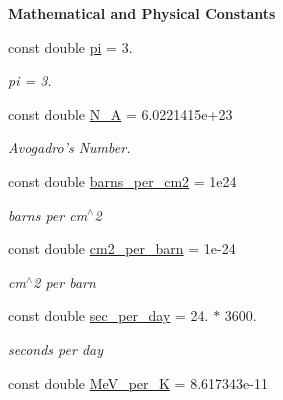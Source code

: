 \begin{Indent}{\bf Mathematical and Physical Constants}\par
\begin{DoxyCompactItemize}
\item 
\hypertarget{namespacepyne_a3b91aba14e56f740dc75b78b9eba037a}{const double \hyperlink{namespacepyne_a3b91aba14e56f740dc75b78b9eba037a}{pi} = 3.}\label{namespacepyne_a3b91aba14e56f740dc75b78b9eba037a}

\begin{DoxyCompactList}\small\item\em pi = 3. \end{DoxyCompactList}\item 
\hypertarget{namespacepyne_a44461c2367af5fc9b6bb0988aac2429b}{const double \hyperlink{namespacepyne_a44461c2367af5fc9b6bb0988aac2429b}{N\+\_\+\+A} = 6.\+0221415e+23}\label{namespacepyne_a44461c2367af5fc9b6bb0988aac2429b}

\begin{DoxyCompactList}\small\item\em Avogadro's Number. \end{DoxyCompactList}\item 
\hypertarget{namespacepyne_ad475cf6f124859f735f6d93ec206ec0d}{const double \hyperlink{namespacepyne_ad475cf6f124859f735f6d93ec206ec0d}{barns\+\_\+per\+\_\+cm2} = 1e24}\label{namespacepyne_ad475cf6f124859f735f6d93ec206ec0d}

\begin{DoxyCompactList}\small\item\em barns per cm$^\wedge$2 \end{DoxyCompactList}\item 
\hypertarget{namespacepyne_a0706fc6ba35f0c6f85cea550344c1815}{const double \hyperlink{namespacepyne_a0706fc6ba35f0c6f85cea550344c1815}{cm2\+\_\+per\+\_\+barn} = 1e-\/24}\label{namespacepyne_a0706fc6ba35f0c6f85cea550344c1815}

\begin{DoxyCompactList}\small\item\em cm$^\wedge$2 per barn \end{DoxyCompactList}\item 
\hypertarget{namespacepyne_a3a54f183e7323b4d62c12f309c3af081}{const double \hyperlink{namespacepyne_a3a54f183e7323b4d62c12f309c3af081}{sec\+\_\+per\+\_\+day} = 24. $\ast$ 3600.}\label{namespacepyne_a3a54f183e7323b4d62c12f309c3af081}

\begin{DoxyCompactList}\small\item\em seconds per day \end{DoxyCompactList}\item 
const double \hyperlink{namespacepyne_af4fb3aac22e7bda0ece3bcf515151611}{Me\+V\+\_\+per\+\_\+\+K} = 8.\+617343e-\/11
\end{DoxyCompactItemize}
\end{Indent}
